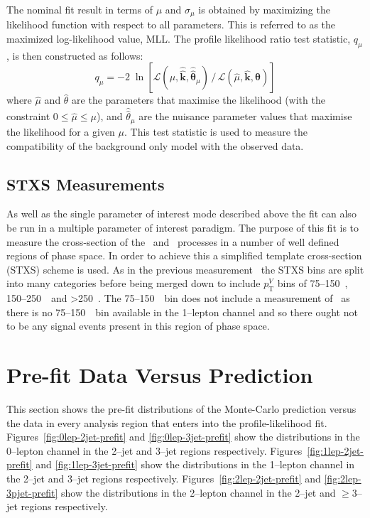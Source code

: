 The nominal fit result in terms of $\mu$ and $\sigma_{\mu}$ is obtained by
maximizing the likelihood function with respect to all parameters. This is
referred to as the maximized log-likelihood value, MLL. The profile likelihood
ratio test statistic, $q_\mu$, is then constructed as follows:
\begin{equation} q_\mu = - 2\; \ln \left[ \mathcal{L} (\mu,
\hat{\hat{\mathbf{k}}}, \hat{\hat{\bm\theta}}_{\mu})\, / \, \mathcal{L}
(\hat{\mu}, \hat{\mathbf{k}}, \hat{\bm\theta}) \right]
\end{equation} where $\hat{\mu}$ and $\hat{\theta}$ are the parameters that
maximise the likelihood (with the constraint $0 \leq \hat{\mu} \leq \mu$), and
$\hat{\hat{\theta}}_\mu$ are the nuisance parameter values that maximise the
likelihood for a given $\mu$. This test statistic is used to measure the
compatibility of the background only model with the observed data.

\subsection{STXS Measurements}

As well as the single parameter of interest mode described above the fit can
also be run in a multiple parameter of interest paradigm. The purpose of this
fit is to measure the cross-section of the \WH\ and \ZH\ processes in a number
of well defined regions of phase space. In order to achieve this a simplified
template cross-section (STXS) scheme is used. As in the previous
measurement~\cite{STXSpaper} the STXS bins are split into many categories before
being merged down to include $p_{\mathrm{T}}^V$ bins of 75--150~\GeV,
150--250~\GeV\ and >250~\GeV. The 75--150~\GeV\ bin does not include a
measurement of \WH\ as there is no 75--150~\GeV\ bin available in the 1--lepton
channel and so there ought not to be any signal events present in this region of
phase space.

\section{Pre-fit Data Versus Prediction}
\label{sec:prefit}

This section shows the pre-fit distributions of the Monte-Carlo prediction
versus the data in every analysis region that enters into the profile-likelihood
fit. Figures~\ref{fig:0lep-2jet-prefit} and \ref{fig:0lep-3jet-prefit} show the
distributions in the 0--lepton channel in the 2--jet and 3--jet regions
respectively. Figures~\ref{fig:1lep-2jet-prefit} and \ref{fig:1lep-3jet-prefit}
show the distributions in the 1--lepton channel in the 2--jet and 3--jet regions
respectively. Figures~\ref{fig:2lep-2jet-prefit} and \ref{fig:2lep-3pjet-prefit}
show the distributions in the 2--lepton channel in the 2--jet and $\geq$3--jet
regions respectively. 





\clearpage
\newpage

